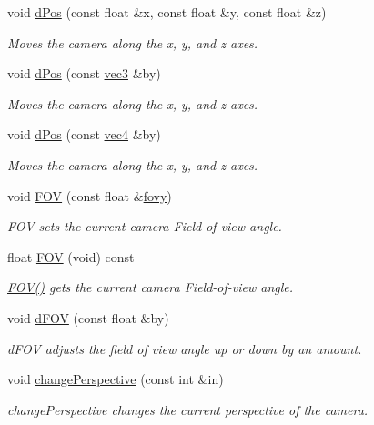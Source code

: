 \begin{DoxyCompactItemize}
void \hyperlink{class_camera_a2ac5f89b4f9f012dead66980925143c0}{d\-Pos} (const float \&x, const float \&y, const float \&z)
\begin{DoxyCompactList}\small\item\em Moves the camera along the x, y, and z axes. \end{DoxyCompactList}\item 
void \hyperlink{class_camera_a928de59670f0b31264307a8a0888b99d}{d\-Pos} (const \hyperlink{struct_angel_1_1vec3}{vec3} \&by)
\begin{DoxyCompactList}\small\item\em Moves the camera along the x, y, and z axes. \end{DoxyCompactList}\item 
void \hyperlink{class_camera_a4ec2e3d2a66826aedb1ac1eee7da0b96}{d\-Pos} (const \hyperlink{struct_angel_1_1vec4}{vec4} \&by)
\begin{DoxyCompactList}\small\item\em Moves the camera along the x, y, and z axes. \end{DoxyCompactList}\item 
void \hyperlink{class_camera_ac325bf616014d2e6023b84b6224630ac}{F\-O\-V} (const float \&\hyperlink{class_camera_acc8b97facc57059530efad534c2f8314}{fovy})
\begin{DoxyCompactList}\small\item\em F\-O\-V sets the current camera Field-\/of-\/view angle. \end{DoxyCompactList}\item 
float \hyperlink{class_camera_a8817ea073431268d8c0e522cdc30026c}{F\-O\-V} (void) const 
\begin{DoxyCompactList}\small\item\em \hyperlink{class_camera_a8817ea073431268d8c0e522cdc30026c}{F\-O\-V()} gets the current camera Field-\/of-\/view angle. \end{DoxyCompactList}\item 
void \hyperlink{class_camera_a55355b3376d195b17adcc6a5b72ae07b}{d\-F\-O\-V} (const float \&by)
\begin{DoxyCompactList}\small\item\em d\-F\-O\-V adjusts the field of view angle up or down by an amount. \end{DoxyCompactList}\item 
void \hyperlink{class_camera_ad388a5f75af8f2289447b716c8c839ff}{change\-Perspective} (const int \&in)
\begin{DoxyCompactList}\small\item\em change\-Perspective changes the current perspective of the camera. \end{DoxyCompactList}\item 

\end{DoxyCompactItemize}
